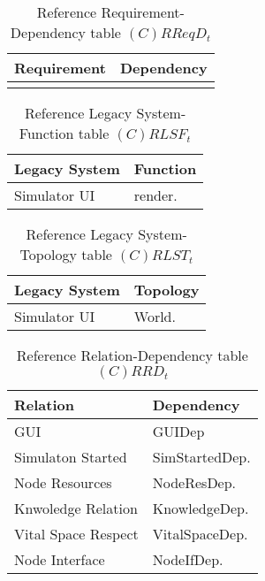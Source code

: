 \begin{table}[H]
	\centering
	\begin{tabular}{|p{4cm}|p{8cm}|}
			\hline
			\textbf{Requirement} & \textbf{Dependency} \\
			\hline
			 & \\
			\hline
		\end{tabular}
		\caption{Reference Requirement-Dependency table $(C)RReqD_t$}
	\label{tab:crreqdt}
\end{table}

\begin{table}[H]
	\centering
	\begin{tabular}{|p{4cm}|p{8cm}|}
			\hline
			\textbf{Legacy System} & \textbf{Function} \\
			\hline
			Simulator UI & render. \\
			\hline
		\end{tabular}
	\caption{Reference Legacy System-Function table $(C)RLSF_t$}
	\label{tab:crlsft}
\end{table}

\begin{table}[H]
	\centering
	\begin{tabular}{|p{4cm}|p{8cm}|}
			\hline
			\textbf{Legacy System} & \textbf{Topology} \\
			\hline
			Simulator UI & World. \\
			\hline
		\end{tabular}
	\caption{Reference Legacy System-Topology table $(C)RLST_t$}
	\label{tab:crlsTt}
\end{table}

\begin{table}[H]
	\centering
	\begin{tabular}{|p{4cm}|p{8cm}|}
			\hline
			\textbf{Relation} & \textbf{Dependency} \\
			\hline
			GUI & GUIDep \\
			\hline
			Simulaton Started & SimStartedDep. \\
			\hline
			Node Resources & NodeResDep. \\
			\hline
			Knwoledge Relation & KnowledgeDep. \\
			\hline
			Vital Space Respect & VitalSpaceDep. \\
			\hline
			Node Interface & NodeIfDep. \\
			\hline
		\end{tabular}
	\caption{Reference Relation-Dependency table $(C)RRD_t$}
	\label{tab:crrdt}
\end{table}


